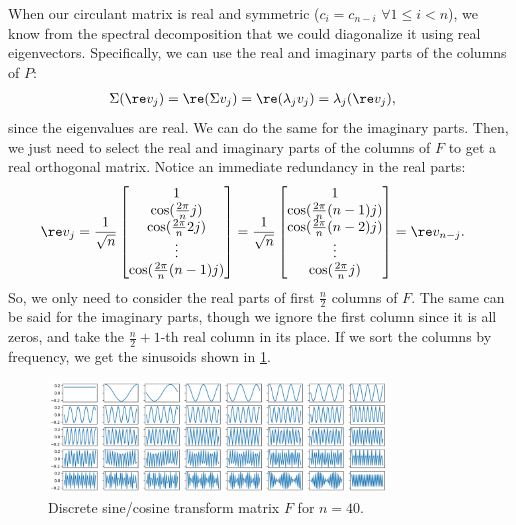 \documentclass{article}
\begin{document}
When our circulant matrix is real and symmetric ($c_i = c_{n-i}$ $\forall 1 \leq i < n$), we know from the spectral decomposition that we could diagonalize it using real eigenvectors.
Specifically, we can use the real and imaginary parts of the columns of $P$:
\begin{align}
  \Sigma (\re v_j)
  &= \re( \Sigma v_j )
  = \re( \lambda_j v_j )
  = \lambda_j (\re v_j),%
\end{align}
since the eigenvalues are real.
We can do the same for the imaginary parts.
Then, we just need to select the real and imaginary parts of the columns of $F$ to get a real orthogonal matrix.
Notice an immediate redundancy in the real parts:
\begin{align}
  \re v_j
  &= \frac{1}{\sqrt{n}} \begin{bmatrix} 1 \\ \cos( \frac{2 \pi}{n} j ) \\ \cos( \frac{2 \pi}{n} 2j ) \\ \vdots \\ \cos( \frac{2 \pi}{n} (n-1) j ) \end{bmatrix}
  = \frac{1}{\sqrt{n}} \begin{bmatrix} 1 \\ \cos( \frac{2 \pi}{n} (n-1)j ) \\ \cos( \frac{2 \pi}{n} (n-2)j ) \\ \vdots \\ \cos( \frac{2 \pi}{n} j ) \end{bmatrix}
  = \re v_{n-j}.
\end{align}
So, we only need to consider the real parts of first $\frac{n}{2}$ columns of $F$.
The same can be said for the imaginary parts, though we ignore the first column since it is all zeros, and take the $\frac{n}{2}+1$-th real column in its place.
If we sort the columns by frequency, we get the sinusoids shown in \cref{fig:fourier_transform_matrix}.
\begin{figure}
  \centering
  \includegraphics[width=0.8\textwidth]{../figs/math/fourier_transform_matrix.png}
  \caption{Discrete sine/cosine transform matrix $F$ for $n=40$.}
  \label{fig:fourier_transform_matrix}
\end{figure}
\end{document}
